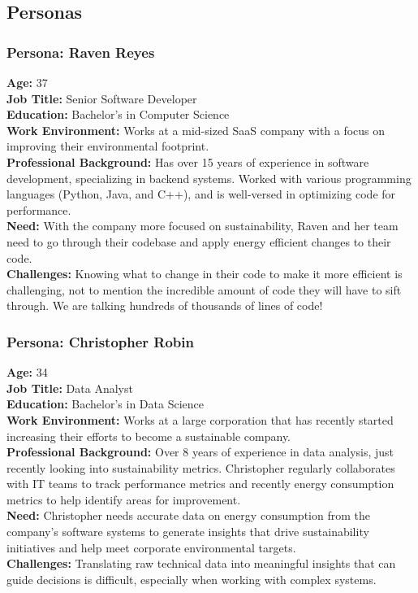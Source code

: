 \documentclass[12pt]{article}
\begin{document}
\subsection{Personas}

\subsubsection*{Persona: Raven Reyes}
\textbf{Age:} 37\\
\textbf{Job Title:} Senior Software Developer\\
\textbf{Education:} Bachelor's in Computer
Science\\[2mm]
\textbf{Work Environment:} Works at a mid-sized SaaS company with a
focus on improving their environmental footprint.\\
\textbf{Professional Background:} Has over 15 years of experience in
software development, specializing in backend systems. Worked with
various programming languages (Python, Java, and C++), and is
well-versed in optimizing code for performance.\\[2mm]
\textbf{Need:} With the company more focused on sustainability, Raven
and her team need to go through their codebase and apply energy
efficient changes to their code.\\
\textbf{Challenges:} Knowing what to change in their code to make it
more efficient is challenging, not to mention the incredible amount
of code they will have to sift through. We are talking hundreds of
thousands of lines of code!

\subsubsection*{Persona: Christopher Robin}
\textbf{Age:} 34\\
\textbf{Job Title:} Data Analyst\\
\textbf{Education:} Bachelor's in Data Science\\[2mm]
\textbf{Work Environment:} Works at a large corporation that has
recently started increasing their efforts to become a sustainable company.\\
\textbf{Professional Background:} Over 8 years of experience in data
analysis, just recently looking into sustainability metrics.
Christopher regularly collaborates with IT teams to track performance
metrics and recently energy consumption metrics to help identify
areas for improvement.\\[2mm]
\textbf{Need:} Christopher needs accurate data on energy consumption
from the company's software systems to generate insights that drive
sustainability initiatives and help meet corporate environmental targets.\\
\textbf{Challenges:} Translating raw technical data into meaningful
insights that can guide decisions is difficult, especially when
working with complex systems.
\end{document}

